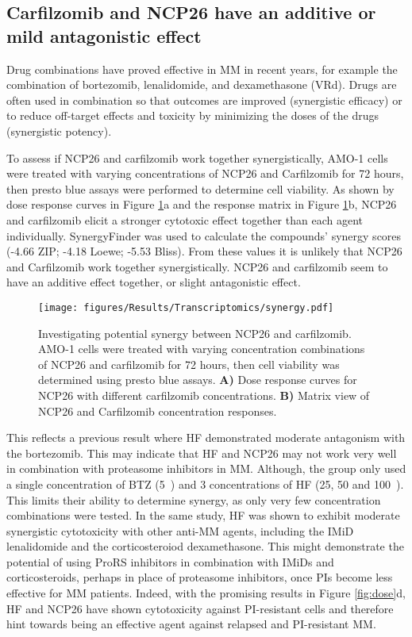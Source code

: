 \subsection{Carfilzomib and NCP26 have an additive or mild antagonistic effect}\label{subsec:synergy}
Drug combinations have proved effective in MM in recent years, for example the combination of bortezomib, lenalidomide, and dexamethasone (VRd).
Drugs are often used in combination so that outcomes are improved (synergistic efficacy) or to reduce off-target effects and toxicity by minimizing the doses of the drugs (synergistic potency)\cite{meyer2019quantifying}.

To assess if NCP26 and carfilzomib work together synergistically, AMO-1 cells were treated with varying concentrations of NCP26 and Carfilzomib for 72 hours, then presto blue assays were performed to determine cell viability.
As shown by dose response curves in Figure \ref{fig:synergy}a and the response matrix in Figure \ref{fig:synergy}b, NCP26 and carfilzomib elicit a stronger cytotoxic effect together than each agent individually.
SynergyFinder\cite{zheng2021synergyfinder} was used to calculate the compounds' synergy scores (-4.66 ZIP; -4.18 Loewe; -5.53 Bliss).
From these values it is unlikely that NCP26 and Carfilzomib work together synergistically.
NCP26 and carfilzomib seem to have an additive effect together, or slight antagonistic effect.
\begin{figure}[h]
\centering
\texttt{[image: figures/Results/Transcriptomics/synergy.pdf]}
\caption[NCP26 and carfilzomib synergism]{Investigating potential synergy between NCP26 and carfilzomib.
AMO-1 cells were treated with varying concentration combinations of NCP26 and carfilzomib for 72 hours, then cell viability was determined using presto blue assays.
\textbf{A)} Dose response curves for NCP26 with different carfilzomib concentrations.
\textbf{B)} Matrix view of NCP26 and Carfilzomib concentration responses.
}
\label{fig:synergy}
\end{figure}
This reflects a previous result where HF demonstrated moderate antagonism with the bortezomib\cite{leiba2012halofuginone}.
This may indicate that HF and NCP26 may not work very well in combination with proteasome inhibitors in MM.
Although, the group only used a single concentration of BTZ (5\si{\nano\Molar}) and 3 concentrations of HF (25, 50 and 100\si{\nano\Molar}).
This limits their ability to determine synergy, as only very few concentration combinations were tested.
In the same study, HF was shown to exhibit moderate synergistic cytotoxicity with other anti-MM agents, including the IMiD lenalidomide and the corticosteroiod dexamethasone.
This might demonstrate the potential of using ProRS inhibitors in combination with IMiDs and corticosteroids, perhaps in place of proteasome inhibitors, once PIs become less effective for MM patients.
Indeed, with the promising results in Figure \ref{fig:dose}d, HF and NCP26 have shown cytotoxicity against PI-resistant cells and therefore hint towards being an effective agent against relapsed and PI-resistant MM\@.

